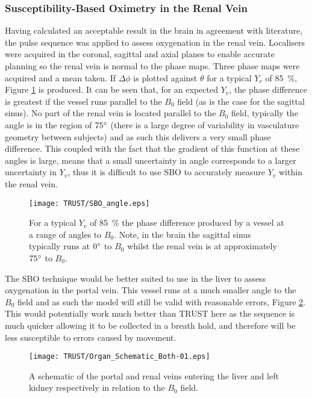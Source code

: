 \subsubsection{Susceptibility-Based Oximetry in the Renal Vein}
Having calculated an acceptable result in the brain in agreement with literature, the pulse sequence was applied to assess oxygenation in the renal vein. Localisers were acquired in the coronal, sagittal and axial planes to enable accurate planning so the renal vein is normal to the phase maps. Three phase maps were acquired and a mean taken. If $\Delta \phi$ is plotted against $\theta$ for a typical $Y_v$ of 85~\%, Figure \ref{fig:SBO_kidney} is produced. It can be seen that, for an expected $Y_v$, the phase difference is greatest if the vessel runs parallel to the $B_0$ field (as is the case for the sagittal sinus). No part of the renal vein is located parallel to the $B_0$ field, typically the angle is in the region of $75\degree$ (there is a large degree of variability in vasculature geometry between subjects) and as such this delivers a very small phase difference. This coupled with the fact that the gradient of this function at these angles is large, means that a small uncertainty in angle corresponds to a larger uncertainty in $Y_v$, thus it is difficult to use \ac{SBO} to accurately measure $Y_v$ within the renal vein.

\begin{figure}[H]
	\centering
	\texttt{[image: TRUST/SBO\_angle.eps]}
	\caption{For a typical $Y_v$ of 85~\% the phase difference produced by a vessel at a range of angles to $B_0$. Note, in the brain the sagittal sinus typically runs at $0\degree$ to $B_0$ whilst the renal vein is at approximately $75\degree$ to $B_0$.}
	\label{fig:SBO_kidney}	
\end{figure}
The \ac{SBO} technique would be better suited to use in the liver to assess oxygenation in the portal vein. This vessel runs at a much smaller angle to the $B_0$ field and as such the model will still be valid with reasonable errors, Figure \ref{fig:PV}. This would potentially work much better than \ac{TRUST} here as the sequence is much quicker allowing it to be collected in a breath hold, and therefore will be less susceptible to errors caused by movement.

\begin{figure}[H]
	\centering
	\texttt{[image: TRUST/Organ\_Schematic\_Both-01.eps]}
	\caption{A schematic of the portal and renal veins entering the liver and left kidney respectively in relation to the $B_0$ field.}
	\label{fig:PV}	
\end{figure}

